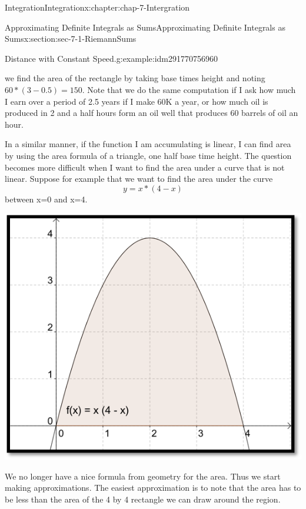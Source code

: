 \documentclass[oneside,10pt,]{book}
\numberwithin{equation}{section}
\begin{document}
\begin{chapterptx}{Integration}{}{Integration}{}{}{x:chapter:chap-7-Intergration}
\begin{sectionptx}{Approximating Definite Integrals as Sums}{}{Approximating Definite Integrals as Sums}{}{}{x:section:sec-7-1-RiemannSums}
\begin{example}{Distance with Constant Speed.}{g:example:idm291770756960}
\begin{sidebyside}{1}{0.2}{0.2}{0}
\begin{sbspanel}{0.6}
\end{sbspanel}%
\end{sidebyside}%
\par
we find the area of the rectangle by taking base times height and noting \(60*(3-0.5)=150\).  Note that we do the same computation if I ask how much I earn over a period of 2.5 years if I make \textdollar{}60K a year, or how much oil is produced in 2 and a half hours form an oil well that produces 60 barrels of oil an hour.%
\end{example}
In a similar manner, if the function I am accumulating is linear, I can find area by using the area formula of a triangle, one half base time height.  The question becomes more difficult when I want to find the area under a curve that is not linear.  Suppose for example that we want to find the area under the curve%
%
\begin{equation*}
y = x * (4-x)
\end{equation*}
between x=0 and x=4.%
\begin{sidebyside}{1}{0.2}{0.2}{0}%
\begin{sbspanel}{0.6}%
\includegraphics[width=\linewidth]{images/sec7-1-2.png}
\end{sbspanel}%
\end{sidebyside}%
\par
We no longer have a nice formula from geometry for the area.  Thus we start making approximations.  The easiest approximation is to note that the area has to be less than the area of the 4 by 4 rectangle we can draw around the region.%

\end{sectionptx}
\end{chapterptx}
\end{document}
